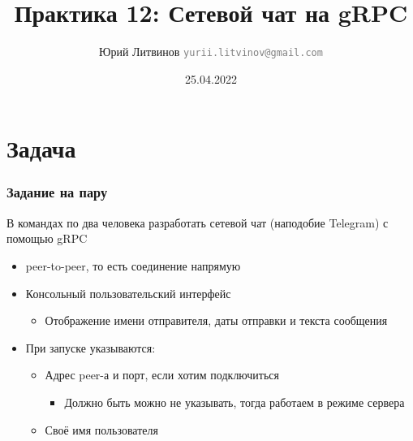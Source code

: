 \documentclass[xetex,mathserif,serif]{beamer}
\title{Практика 12: Сетевой чат на gRPC}
\author[Юрий Литвинов]{Юрий Литвинов \newline \textcolor{gray}{\small\texttt{yurii.litvinov@gmail.com}}}
\date{25.04.2022}
\begin{document}
    
    \frame{\titlepage}

    \section{Задача}

    \begin{frame}
        \frametitle{Задание на пару}
        В командах по два человека разработать сетевой чат (наподобие Telegram) с помощью gRPC
        \begin{itemize}
            \item peer-to-peer, то есть соединение напрямую
            \item Консольный пользовательский интерфейс
            \begin{itemize}
                \item Отображение имени отправителя, даты отправки и текста сообщения
            \end{itemize}
            \item При запуске указываются:
            \begin{itemize}
                \item Адрес peer-а и порт, если хотим подключиться
                \begin{itemize}
                    \item Должно быть можно не указывать, тогда работаем в режиме сервера
                \end{itemize}
                \item Своё имя пользователя
            \end{itemize}
        \end{itemize}
    \end{frame}
\end{document}
